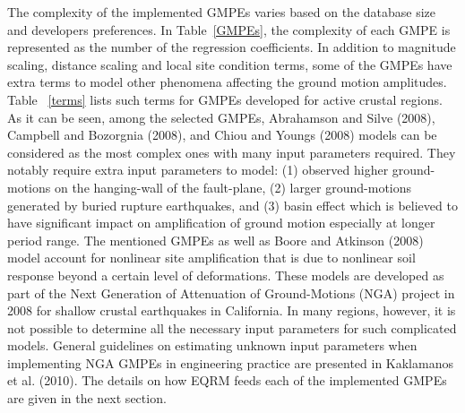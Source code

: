 The complexity of the implemented GMPEs varies based on the database
size and developers preferences. In Table~\ref{GMPEs}, the
complexity of each GMPE is represented as the number of the
regression coefficients. In addition to magnitude scaling, distance
scaling and local site condition terms, some of the GMPEs have extra
terms to model other phenomena affecting the ground motion
amplitudes. Table ~\ref{terms} lists such terms for GMPEs developed
for active crustal regions. As it can be seen, among the selected
GMPEs, Abrahamson and Silve (2008), Campbell and Bozorgnia (2008),
and Chiou and Youngs (2008) models can be considered as the most
complex ones with many input parameters required. They notably
require extra input parameters to model: (1) observed higher
ground-motions on the hanging-wall of the fault-plane, (2) larger
ground-motions generated by buried rupture earthquakes, and (3)
basin effect which is believed to have significant impact on
amplification of ground motion especially at longer period range.
The mentioned GMPEs as well as Boore and Atkinson (2008) model
account for nonlinear site amplification that is due to nonlinear
soil response beyond a certain level of deformations. These models
are developed as part of the Next Generation of Attenuation of
Ground-Motions (NGA) project in 2008 for shallow crustal earthquakes
in California. In many regions, however, it is not possible to
determine all the necessary input parameters for such complicated
models. General guidelines on estimating unknown input parameters
when implementing NGA GMPEs in engineering practice are presented in
Kaklamanos et al. (2010). The details on how EQRM feeds each of the
implemented GMPEs are given in the next section.
